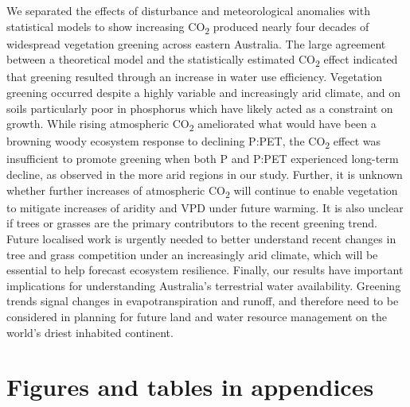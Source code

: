 \documentclass[gc, manuscript]{copernicus}
\begin{document}
\conclusions[Conclusions]We separated the effects of disturbance and
meteorological anomalies with statistical models to show increasing
CO\textsubscript{2} produced nearly four decades of widespread
vegetation greening across eastern Australia. The large agreement
between a theoretical model and the statistically estimated
CO\textsubscript{2} effect indicated that greening resulted through an
increase in water use efficiency. Vegetation greening occurred despite a
highly variable and increasingly arid climate, and on soils particularly
poor in phosphorus which have likely acted as a constraint on growth.
While rising atmospheric CO\textsubscript{2} ameliorated what would have
been a browning woody ecosystem response to declining P:PET, the
CO\textsubscript{2} effect was insufficient to promote greening when
both P and P:PET experienced long-term decline, as observed in the more
arid regions in our study. Further, it is unknown whether further
increases of atmospheric CO\textsubscript{2} will continue to enable
vegetation to mitigate increases of aridity and VPD under future
warming. It is also unclear if trees or grasses are the primary
contributors to the recent greening trend. Future localised work is
urgently needed to better understand recent changes in tree and grass
competition under an increasingly arid climate, which will be essential
to help forecast ecosystem resilience. Finally, our results have
important implications for understanding Australia's terrestrial water
availability. Greening trends signal changes in evapotranspiration and
runoff, and therefore need to be considered in planning for future land
and water resource management on the world's driest inhabited continent.







\appendix
\section{Figures and tables in appendices}
\end{document}
